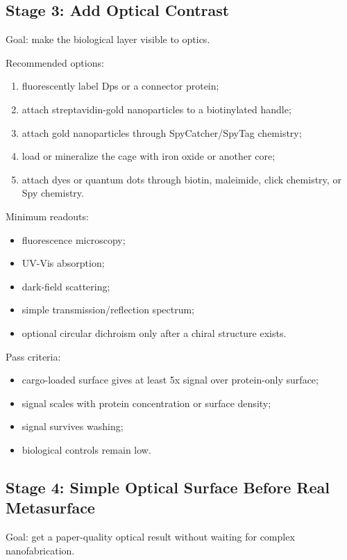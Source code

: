 \documentclass[11pt]{article}
\begin{document}
\subsection{Stage 3: Add Optical Contrast}

Goal: make the biological layer visible to optics.

Recommended options:

\begin{enumerate}
\item fluorescently label Dps or a connector protein;
\item attach streptavidin-gold nanoparticles to a biotinylated handle;
\item attach gold nanoparticles through SpyCatcher/SpyTag chemistry;
\item load or mineralize the cage with iron oxide or another core;
\item attach dyes or quantum dots through biotin, maleimide, click chemistry, or Spy chemistry.
\end{enumerate}

Minimum readouts:

\begin{itemize}
\item fluorescence microscopy;
\item UV-Vis absorption;
\item dark-field scattering;
\item simple transmission/reflection spectrum;
\item optional circular dichroism only after a chiral structure exists.
\end{itemize}

Pass criteria:

\begin{itemize}
\item cargo-loaded surface gives at least 5x signal over protein-only surface;
\item signal scales with protein concentration or surface density;
\item signal survives washing;
\item biological controls remain low.
\end{itemize}

\subsection{Stage 4: Simple Optical Surface Before Real Metasurface}

Goal: get a paper-quality optical result without waiting for complex nanofabrication.
\end{document}
